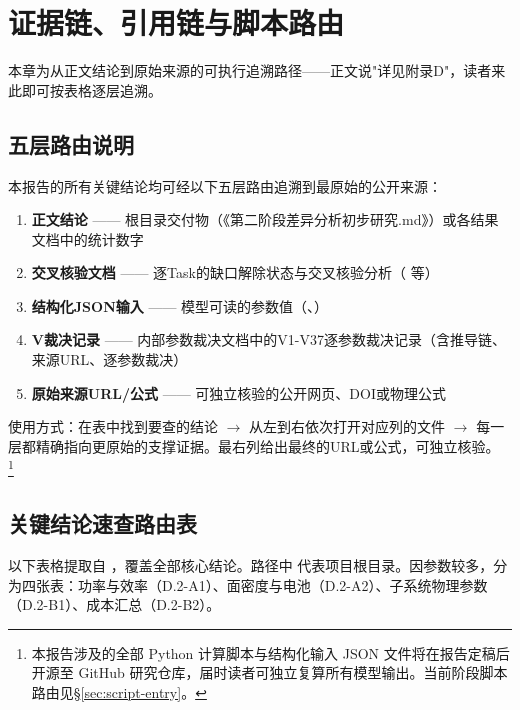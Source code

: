 
\section{证据链、引用链与脚本路由}

本章为从正文结论到原始来源的可执行追溯路径——正文说"详见附录D"，读者来此即可按表格逐层追溯。

\subsection{五层路由说明}
\label{sec:five-layer}

本报告的所有关键结论均可经以下五层路由追溯到最原始的公开来源：

\begin{enumerate}
  \item \textbf{正文结论} —— 根目录交付物（《第二阶段差异分析初步研究.md》）或各结果文档中的统计数字
  \item \textbf{交叉核验文档} —— 逐Task的缺口解除状态与交叉核验分析（ 等）
  \item \textbf{结构化JSON输入} —— 模型可读的参数值（、）
  \item \textbf{V裁决记录} —— 内部参数裁决文档中的V1-V37逐参数裁决记录（含推导链、来源URL、逐参数裁决）
  \item \textbf{原始来源URL/公式} —— 可独立核验的公开网页、DOI或物理公式
\end{enumerate}

使用方式：在表中找到要查的结论 $\to$ 从左到右依次打开对应列的文件 $\to$ 每一层都精确指向更原始的支撑证据。最右列给出最终的URL或公式，可独立核验。\\[4pt]
\footnote{本报告涉及的全部 Python 计算脚本与结构化输入 JSON 文件将在报告定稿后开源至 GitHub 研究仓库，届时读者可独立复算所有模型输出。当前阶段脚本路由见§\ref{sec:script-entry}。}

\subsection{关键结论速查路由表}
\label{sec:quick-routing}

以下表格提取自 ，覆盖全部核心结论。路径中  代表项目根目录。因参数较多，分为四张表：功率与效率（D.2-A1）、面密度与电池（D.2-A2）、子系统物理参数（D.2-B1）、成本汇总（D.2-B2）。

